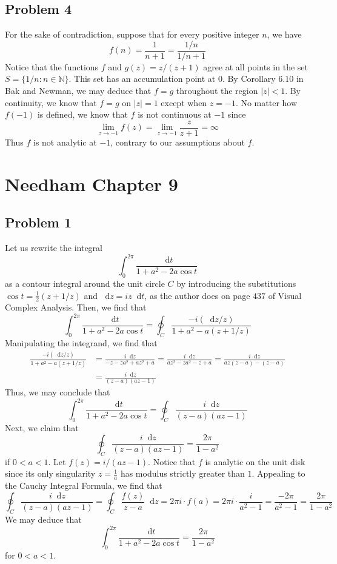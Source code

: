 \documentclass[12pt]{article}
\newcommand{\N}{\mathbb{N}}
\newcommand*\diff{\mathop{}\!\mathrm{d}}
\begin{document}
\subsection*{Problem 4}
For the sake of contradiction, suppose that for every positive integer $n$, we have
\[
f(n) = \frac{1}{n+1} = \frac{1/n}{1/n + 1}
\] Notice that the functions $f$ and $g(z) = z/(z+1)$ agree at all points in the set $S = \{1/n: n \in \N\}$. This set has an accumulation point at $0$. By Corollary $6.10$ in Bak and Newman, we may deduce that $f = g$ throughout the region $\vert z \vert < 1$. By continuity, we know that $f = g$ on $\vert z \vert = 1$ except when $z = -1$. No matter how $f(-1)$ is defined, we know that $f$ is not continuous at $-1$ since
\[
\lim_{z \rightarrow -1} f(z) = \lim_{z \rightarrow -1} \frac{z}{z+1} = \infty
\] Thus $f$ is not analytic at $-1$, contrary to our assumptions about $f$.
\newpage
\section*{Needham Chapter 9}
\subsection*{Problem 1}
Let us rewrite the integral 
\[
\int_0^{2\pi} \frac{\diff t}{1 + a^2 - 2a \cos t }
\] as a contour integral around the unit circle $C$ by introducing the substitutions $\cos t = \frac{1}{2}( z + 1/z)$ and $\diff z = iz \diff t$, as the author does on page $437$ of Visual Complex Analysis. Then, we find that
\[
\int_0^{2\pi} \frac{\diff t}{1 + a^2 - 2a \cos t } = \oint_C \frac{-i (\diff z /z)}{1+a^2 - a(z+1/z)}
\] Manipulating the integrand, we find that
\begin{align*}
\frac{-i (\diff z /z)}{1+a^2 - a(z+1/z)} &= \frac{i\diff z }{-z - za^2 + az^2 + a} = \frac{i \diff z}{az^2 - za^2 - z + a} = \frac{i \diff z}{az(z - a) - (z - a)} \\
& = \frac{i \diff z}{(z - a)(az-1)}
\end{align*} Thus, we may conclude that
\[
\int_0^{2\pi} \frac{\diff t}{1 + a^2 - 2a \cos t } = \oint_C \frac{i \diff z}{(z - a)(az-1)}
\] Next, we claim that
\[
\oint_C \frac{i \diff z}{(z - a)(az-1)} = \frac{2\pi}{1-a^2}
\] if $0 < a < 1$. Let $f(z) = i/(az-1)$. Notice that $f$ is analytic on the unit disk since its only singularity $z = \frac{1}{a}$ has modulus strictly greater than $1$. Appealing to the Cauchy Integral Formula, we find that
\[
\oint_C \frac{i \diff z}{(z - a)(az-1)} =  \oint_C \frac{f(z)}{z-a}\diff z = 2\pi i \cdot f(a) = 2\pi i \cdot \frac{i}{a^2 - 1} = \frac{-2\pi}{a^2 - 1} = \frac{2\pi}{1-a^2}
\] We may deduce that
\[
\int_0^{2\pi} \frac{\diff t}{1 + a^2 - 2a \cos t } = \frac{2\pi}{1-a^2}
\] for $0 < a < 1$.
\newpage
\end{document}
